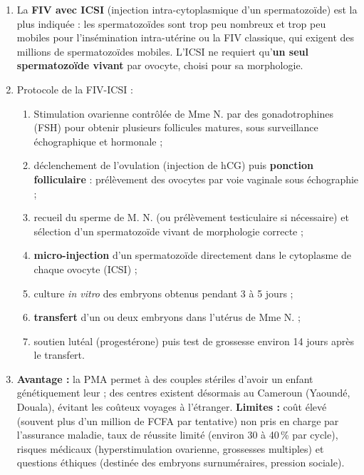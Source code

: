 \documentclass[11pt]{article}
\begin{document}
\begin{corrige}
\begin{enumerate}
\item La \textbf{FIV avec ICSI} (injection intra-cytoplasmique d'un spermatozoïde) est la plus indiquée : les spermatozoïdes sont trop peu nombreux et trop peu mobiles pour l'insémination intra-utérine ou la FIV classique, qui exigent des millions de spermatozoïdes mobiles. L'ICSI ne requiert qu'\textbf{un seul spermatozoïde vivant} par ovocyte, choisi pour sa morphologie.
\item Protocole de la FIV-ICSI :
\begin{enumerate}
\item Stimulation ovarienne contrôlée de Mme N. par des gonadotrophines (FSH) pour obtenir plusieurs follicules matures, sous surveillance échographique et hormonale ;
\item déclenchement de l'ovulation (injection de hCG) puis \textbf{ponction folliculaire} : prélèvement des ovocytes par voie vaginale sous échographie ;
\item recueil du sperme de M. N. (ou prélèvement testiculaire si nécessaire) et sélection d'un spermatozoïde vivant de morphologie correcte ;
\item \textbf{micro-injection} d'un spermatozoïde directement dans le cytoplasme de chaque ovocyte (ICSI) ;
\item culture \emph{in vitro} des embryons obtenus pendant 3 à 5 jours ;
\item \textbf{transfert} d'un ou deux embryons dans l'utérus de Mme N. ;
\item soutien lutéal (progestérone) puis test de grossesse environ 14 jours après le transfert.
\end{enumerate}
\item \textbf{Avantage :} la PMA permet à des couples stériles d'avoir un enfant génétiquement leur ; des centres existent désormais au Cameroun (Yaoundé, Douala), évitant les coûteux voyages à l'étranger. \textbf{Limites :} coût élevé (souvent plus d'un million de FCFA par tentative) non pris en charge par l'assurance maladie, taux de réussite limité (environ 30 à 40\,\% par cycle), risques médicaux (hyperstimulation ovarienne, grossesses multiples) et questions éthiques (destinée des embryons surnuméraires, pression sociale).
\end{enumerate}
\end{corrige}
\end{document}
